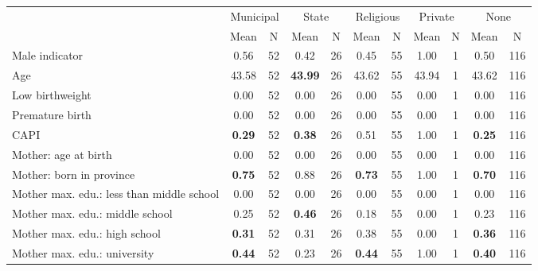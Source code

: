 \begin{tabular}{l c c c c c c c c c c}
\toprule
& \multicolumn{2}{c}{Municipal} & \multicolumn{2}{c}{State} & \multicolumn{2}{c}{Religious} & \multicolumn{2}{c}{Private} & \multicolumn{2}{c}{None} \\
& \scriptsize Mean & \scriptsize N & \scriptsize Mean & \scriptsize N & \scriptsize Mean & \scriptsize N & \scriptsize Mean & \scriptsize N & \scriptsize Mean & \scriptsize N \\
\midrule
Male indicator &      0.56 &        52 &      0.42 &        26 &      0.45 &        55 &      1.00 &         1 &      0.50 &       116 \\
Age &     43.58 &        52 & \textbf{    43.99} &        26 &     43.62 &        55 &     43.94 &         1 &     43.62 &       116 \\
Low birthweight &      0.00 &        52 &      0.00 &        26 &      0.00 &        55 &      0.00 &         1 &      0.00 &       116 \\
Premature birth &      0.00 &        52 &      0.00 &        26 &      0.00 &        55 &      0.00 &         1 &      0.00 &       116 \\
CAPI & \textbf{     0.29} &        52 & \textbf{     0.38} &        26 &      0.51 &        55 &      1.00 &         1 & \textbf{     0.25} &       116 \\
Mother: age at birth &      0.00 &        52 &      0.00 &        26 &      0.00 &        55 &      0.00 &         1 &      0.00 &       116 \\
Mother: born in province & \textbf{     0.75} &        52 &      0.88 &        26 & \textbf{     0.73} &        55 &      1.00 &         1 & \textbf{     0.70} &       116 \\
Mother max. edu.: less than middle school &      0.00 &        52 &      0.00 &        26 &      0.00 &        55 &      0.00 &         1 &      0.00 &       116 \\
Mother max. edu.: middle school &      0.25 &        52 & \textbf{     0.46} &        26 &      0.18 &        55 &      0.00 &         1 &      0.23 &       116 \\
Mother max. edu.: high school & \textbf{     0.31} &        52 &      0.31 &        26 &      0.38 &        55 &      0.00 &         1 & \textbf{     0.36} &       116 \\
Mother max. edu.: university & \textbf{     0.44} &        52 &      0.23 &        26 & \textbf{     0.44} &        55 &      1.00 &         1 & \textbf{     0.40} &       116 \\

\end{tabular}
